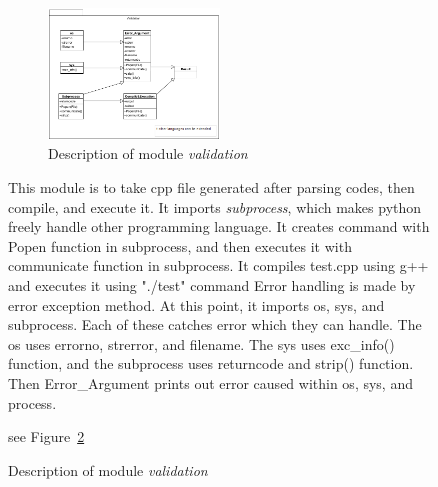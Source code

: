 \documentclass[conference]{IEEEtran}
\begin{document}
\begin{itemize}
\begin{itemize}
\begin{itemize}
\begin{itemize}
\begin{figure}[h]
\begin{enumerate}
\begin{itemize}
\begin{enumerate}
\begin{figure}[ht]
\centering
\includegraphics[width=0.5\textwidth]{./figures/comp_exec.png}
\caption{Description of module \textit{validation}}
\label{validation}
\end{figure}
This module is to take cpp file generated after parsing codes, then compile, and execute it.
It imports \textit{subprocess}, which makes python freely handle other programming language.
It creates command with Popen function in subprocess, and then executes it with communicate function in subprocess.
It compiles test.cpp using g++ and executes it using "./test" command
Error handling is made by error exception method. 
At this point, it imports os, sys, and subprocess. 
Each of these catches error which they can handle.
The os uses errorno, strerror, and filename.
The sys uses exc\_info() function, and the subprocess uses returncode and strip() function.
Then Error\_Argument prints out error caused within os, sys, and process.

see Figure~\ref{validation}


\end{enumerate}
\end{itemize}
\end{enumerate}
\end{figure}
\end{itemize}
\end{itemize}
\end{itemize}
\end{itemize}
\end{document}
